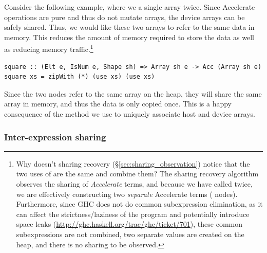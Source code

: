 Consider the following example, where we  a single array twice. Since
Accelerate operations are pure and thus do not mutate arrays, the device arrays
can be safely shared. Thus, we would like these two arrays to refer to the same
data in \GPU memory. This reduces the amount of memory required to store the
data as well as reducing memory traffic.\footnote{Why doesn't sharing recovery
(\S\ref{sec:sharing_observation}) notice that the two uses of  are
the same and combine them? The sharing recovery algorithm observes the sharing
of \emph{Accelerate} terms, and because we have called  twice, we
are effectively constructing two \emph{separate} Accelerate terms
( nodes). Furthermore, since GHC does not do common subexpression
elimination, as it can affect the strictness/laziness of the program and
potentially introduce space leaks
(\url{http://ghc.haskell.org/trac/ghc/ticket/701}), these common subexpressions
are not combined, two separate values are created on the heap, and there is no
sharing to be observed.}
%
\begin{lstlisting}[style=haskell]
square :: (Elt e, IsNum e, Shape sh) => Array sh e -> Acc (Array sh e)
square xs = zipWith (*) (use xs) (use xs)
\end{lstlisting}

Since the two  nodes refer to the same array on the heap, they will
share the same array in \GPU memory, and thus the data is only copied once.
This is a happy consequence of the method we use to uniquely associate host and
device arrays.


\subsubsection{Inter-expression sharing}

